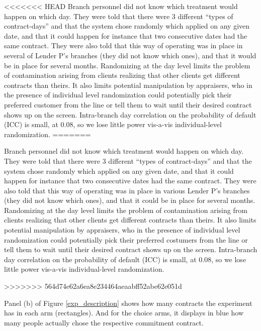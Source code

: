 \documentclass[oneside,11pt]{article}
\begin{document}
<<<<<<< HEAD
 Branch personnel did not know which treatment would happen on which day. They were told that there were 3 different ``types of contract-days'' and that the system chose randomly which applied on any given date, and that it could happen for instance that two consecutive dates had the same contract. They were also told that this way of operating was in place in several of Lender P's branches (they did not know which ones), and that it would be in place for several months. Randomizing at the day level limits the problem of contamination arising from clients realizing that other clients get different contracts than theirs. It also limits potential manipulation by appraisers, who in the presence of individual level randomization could potentially pick their preferred customer from the line or tell them to wait until their desired contract shows up on the screen. Intra-branch day correlation on the probability of default (ICC) is small, at {0.08}, so we lose little power vis-a-vis individual-level randomization.
=======

 Branch personnel did not know which treatment would happen on which day. They were told that there were 3 different ``types of contract-days'' and that the system chose randomly which applied on any given date, and that it could happen for instance that two consecutive dates had the same contract. They were also told that this way of operating was in place in various Lender P's branches (they did not know which ones), and that it could be in place for several months. Randomizing at the day level limits the problem of contamination arising from clients realizing that other clients get different contracts than theirs. It also limits potential manipulation by appraisers, who in the presence of individual level randomization could potentially pick their preferred costumers from the line or tell them to wait until their desired contract shows up on the screen. Intra-branch day correlation on the probability of default (ICC) is small, at {0.08}, so we lose little power vis-a-vis individual-level randomization.


>>>>>>> 564d74e62a6ea8e234464aeaabff52abe62e051d

Panel (b) of Figure \ref{exp_description} shows how many contracts the experiment has in each arm (rectangles). And for the choice arms, it displays in blue how many people actually chose the respective commitment contract.
\end{document}
